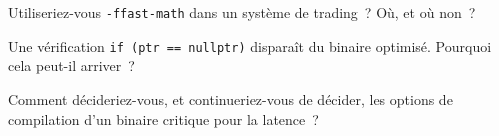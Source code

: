 \begin{interviewq}\label{iq:ll:cpp-for-latency-iii-the-compiler:4}
Utiliseriez-vous \texttt{-ffast-math} dans un système de trading~? Où, et où non~?
\end{interviewq}

\begin{interviewq}\label{iq:ll:cpp-for-latency-iii-the-compiler:5}
Une vérification \texttt{if (ptr == nullptr)} disparaît du binaire optimisé. Pourquoi cela peut-il arriver~?
\end{interviewq}

\begin{interviewq}\label{iq:ll:cpp-for-latency-iii-the-compiler:6}
Comment décideriez-vous, et continueriez-vous de décider, les options de compilation d'un binaire critique pour la latence~?
\end{interviewq}
